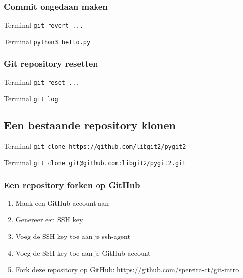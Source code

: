 \documentclass[]{beamer}
\begin{document}
\begin{frame}[fragile]
    \frametitle{Commit ongedaan maken}

    \begin{block}{Terminal}
    \verb/git revert .../
    \end{block}

    \pause

    \begin{block}{Terminal}
    \verb/python3 hello.py/
    \end{block}
\end{frame}

\begin{frame}[fragile]
    \frametitle{Git repository resetten}

    \begin{block}{Terminal}
    \verb/git reset .../
    \end{block}

    \pause

    \begin{block}{Terminal}
    \verb/git log/
    \end{block}
\end{frame}

\subsection{Een bestaande repository klonen}

\begin{frame}[fragile]
    \begin{block}{Terminal}
    \verb$git clone https://github.com/libgit2/pygit2$
    \end{block}

    \pause

    \begin{block}{Terminal}
    \verb$git clone git@github.com:libgit2/pygit2.git$
    \end{block}
\end{frame}

\begin{frame}
    \frametitle{Een repository forken op GitHub}

    \begin{enumerate}
        \item Maak een GitHub account aan
        \item Genereer een SSH key
        \item Voeg de SSH key toe aan je ssh-agent
        \item Voeg de SSH key toe aan je GitHub account
        \item Fork deze repository op GitHub: \url{https://github.com/spereira-ct/git-intro}
    \end{enumerate}
\end{frame}
\end{document}
